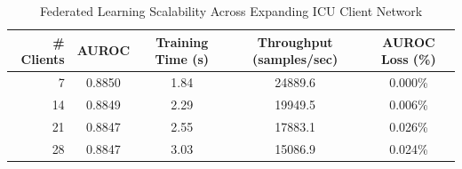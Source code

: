 \begin{table}[h!]
\centering
\caption{Federated Learning Scalability Across Expanding ICU Client Network}
\label{tab:scalability}
\begin{tabular}{rcccc}
\toprule
\textbf{\# Clients} & \textbf{AUROC} & \textbf{Training Time (s)} & \textbf{Throughput (samples/sec)} & \textbf{AUROC Loss (\%)} \\
\midrule
7 & 0.8850 & 1.84 & 24889.6 & 0.000\% \\
14 & 0.8849 & 2.29 & 19949.5 & 0.006\% \\
21 & 0.8847 & 2.55 & 17883.1 & 0.026\% \\
28 & 0.8847 & 3.03 & 15086.9 & 0.024\% \\
\bottomrule
\end{tabular}
\end{table}
